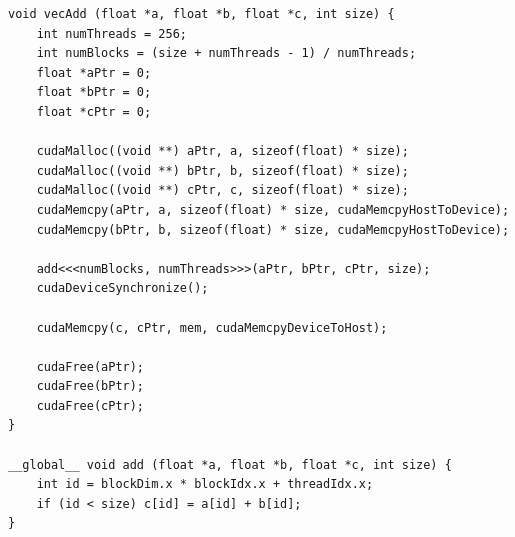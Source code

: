 \lstset{language=C}
\begin{lstlisting}
void vecAdd (float *a, float *b, float *c, int size) {
	int numThreads = 256;
	int numBlocks = (size + numThreads - 1) / numThreads;
	float *aPtr = 0;
	float *bPtr = 0;
	float *cPtr = 0;	
	
	cudaMalloc((void **) aPtr, a, sizeof(float) * size);
	cudaMalloc((void **) bPtr, b, sizeof(float) * size);
	cudaMalloc((void **) cPtr, c, sizeof(float) * size);	
	cudaMemcpy(aPtr, a, sizeof(float) * size, cudaMemcpyHostToDevice);
	cudaMemcpy(bPtr, b, sizeof(float) * size, cudaMemcpyHostToDevice);	
	
	add<<<numBlocks, numThreads>>>(aPtr, bPtr, cPtr, size);
	cudaDeviceSynchronize();
	
	cudaMemcpy(c, cPtr, mem, cudaMemcpyDeviceToHost);
	
	cudaFree(aPtr);
	cudaFree(bPtr);
	cudaFree(cPtr);
}

__global__ void add (float *a, float *b, float *c, int size) {
	int id = blockDim.x * blockIdx.x + threadIdx.x;
	if (id < size) c[id] = a[id] + b[id];
}
\end{lstlisting} 

